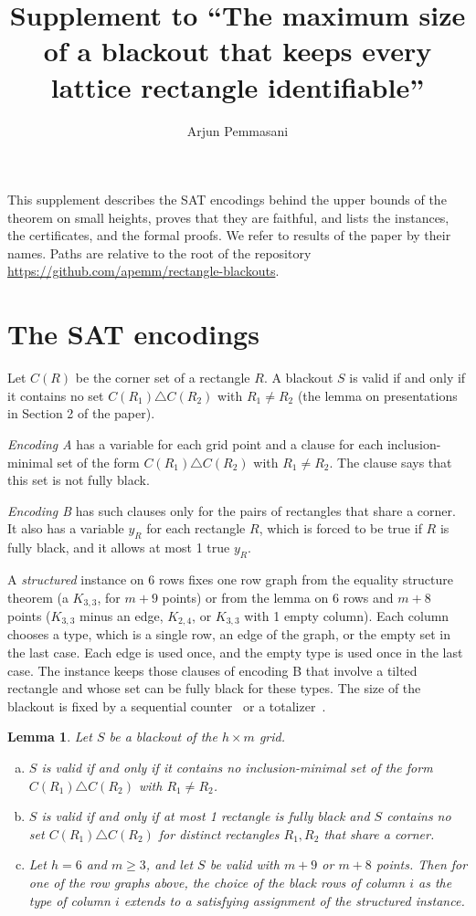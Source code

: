 \documentclass[11pt]{article}
\title{Supplement to ``The maximum size of a blackout that keeps every lattice rectangle
identifiable''}
\author{Arjun Pemmasani}
\date{}
\newtheorem{lemma}{Lemma}
\begin{document}
\maketitle

This supplement describes the SAT encodings behind the upper bounds of the theorem on small
heights, proves that they are faithful, and lists the instances, the certificates, and the
formal proofs. We refer to results of the paper by their names. Paths are relative to the
root of the repository \url{https://github.com/apemm/rectangle-blackouts}.

\section{The SAT encodings}

Let $C(R)$ be the corner set of a rectangle $R$. A blackout $S$ is valid if and only if it
contains no set $C(R_1)\triangle C(R_2)$ with $R_1\ne R_2$ (the lemma on presentations in
Section 2 of the paper).

\emph{Encoding A} has a variable for each grid point and a clause for each
inclusion-minimal set of the form $C(R_1)\triangle C(R_2)$ with $R_1\ne R_2$. The clause
says that this set is not fully black.

\emph{Encoding B} has such clauses only for the pairs of rectangles that share a corner.
It also has a variable $y_R$ for each rectangle $R$, which is forced to be true if $R$ is
fully black, and it allows at most 1 true $y_R$.

A \emph{structured} instance on 6 rows fixes one row graph from the equality structure
theorem (a $K_{3,3}$, for $m+9$ points) or from the lemma on 6 rows and $m+8$ points
($K_{3,3}$ minus an edge, $K_{2,4}$, or $K_{3,3}$ with 1 empty column). Each column chooses
a type, which is a single row, an edge of the graph, or the empty set in the last case. Each
edge is used once, and the empty type is used once in the last case. The instance keeps
those clauses of encoding B that involve a tilted rectangle and whose set can be fully
black for these types. The size of the blackout is fixed by a sequential
counter~\cite{sinz} or a totalizer~\cite{bailleux}.

\begin{lemma}\label{lem:enc}
Let $S$ be a blackout of the $h\times m$ grid.
\begin{enumerate}[(a)]
\item $S$ is valid if and only if it contains no inclusion-minimal set of the form
$C(R_1)\triangle C(R_2)$ with $R_1\ne R_2$.
\item $S$ is valid if and only if at most 1 rectangle is fully black and $S$ contains no
set $C(R_1)\triangle C(R_2)$ for distinct rectangles $R_1,R_2$ that share a corner.
\item Let $h=6$ and $m\ge3$, and let $S$ be valid with $m+9$ or $m+8$ points. Then for one
of the row graphs above, the choice of the black rows of column $i$ as the type of column
$i$ extends to a satisfying assignment of the structured instance.
\end{enumerate}
\end{lemma}
\end{document}
